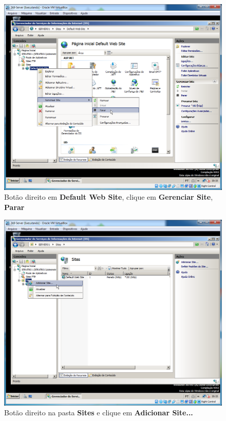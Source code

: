 \documentclass[10pt]{article}
\begin{document}
\begin{figure}[H]
    \centering
    \caption{Botão direito em \textbf{Default Web Site}, clique em \textbf{Gerenciar Site}, \textbf{Parar}}
    \label{fig:5532039}
    \includegraphics[width=\linewidth]{images/IIS/criando_um_novo_site/039.png}
\end{figure}
\begin{figure}[H]
    \centering
    \caption{Botão direito na pasta \textbf{Sites} e clique em \textbf{Adicionar Site...}}
    \label{fig:5532040}
    \includegraphics[width=\linewidth]{images/IIS/criando_um_novo_site/040.png}
\end{figure}
\end{document}
